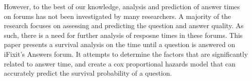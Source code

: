 \documentclass[12pt]{article}
\begin{document}
    However, to the best of our knowledge, analysis and prediction of answer times on forums has not been investigated by many researchers. A majority of the research focuses on assessing and predicting the question and answer quality. As such, there is a need for further analysis of resposne times in these forums. This paper presents a survival analysis on the time until a question is answered on iFixit's Answers forum. It attempts to determine the factors that are significantly related to answer time, and create a cox proportional hazards model that can accurately predict the survival probability of a question. 




\end{document}
